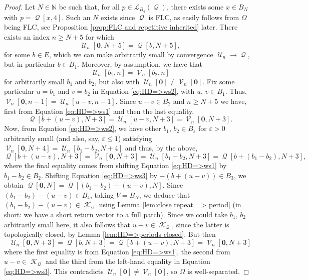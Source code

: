 \documentclass[11pt]{amsart}
\numberwithin{equation}{section}
\theoremstyle{plain}
\theoremstyle{definition}
\newcommand{\N}{\mathbb N}
\renewcommand{\epsilon}{\varepsilon}
\DeclareMathOperator{\cQ}{\mathcal{Q}}
\DeclareMathOperator{\cU}{\mathcal{U}}
\DeclareMathOperator{\cV}{\mathcal{V}}
\DeclareMathOperator{\cK}{\mathcal{K}}
\newcommand{\lang}{\mathscr{L}}
\begin{document}
\begin{proof}
Let \(N \in \N\) be such that, for all \(p \in \lang_{B_4}(\cQ)\), there exists some \(x \in B_N\) with \(p = \cQ[x,4]\). Such an \(N\) exists since \(\cQ\) is FLC, as easily follows from \(\Omega\) being FLC, see Proposition \ref{prop:FLC and repetitive inherited} later. There exists an index \(n \geq N+5\) for which
\begin{equation}\label{eq:HD=>ws1}
\cU_n[\mathbf{0},N+5] = \cQ[b,N+5] ,
\end{equation}
for some \(b \in E\), which we can make arbitrarily small by convergence \(\cU_n \to \cQ\), but in particular \(b \in B_1\). Moreover, by assumption, we have that
\begin{equation} \label{eq:HD=>ws2}
\cU_n[b_1,n] = \cV_n[b_2,n]
\end{equation}
for arbitrarily small \(b_1\) and \(b_2\), but also with \(\cU_n[\mathbf{0}] \neq \cV_n[\mathbf{0}]\). Fix some particular \(u = b_1\) and \(v = b_2\) in Equation \ref{eq:HD=>ws2}, with \(u\), \(v \in B_1\). Thus, \(\cV_n[\mathbf{0},n-1] = \cU_n[u-v,n-1]\). Since \(u-v \in B_2\) and \(n \geq N+5\) we have, first from Equation \ref{eq:HD=>ws1} and then the last equality,
\[
\cQ[b + (u-v),N+3] = \cU_n[u-v,N+3] = \cV_n[\mathbf{0},N+3] .
\]
Now, from Equation \ref{eq:HD=>ws2}, we have other \(b_1\), \(b_2 \in B_\epsilon\) for \(\epsilon > 0\) arbitrarily small (and also, say, \(\epsilon \leq 1\)) satisfying \(\cV_n[\mathbf{0},N+4] = \cU_n[b_1 - b_2,N+4]\) and thus, by the above,
\begin{equation}\label{eq:HD=>ws3}
\cQ[b + (u-v),N+3] = \cV_n[\mathbf{0},N+3] = \cU_n[b_1-b_2,N+3] = \cQ[b + (b_1-b_2),N+3] ,
\end{equation}
where the final equality comes from shifting Equation \ref{eq:HD=>ws1} by \(b_1-b_2 \in B_2\). Shifting Equation \ref{eq:HD=>ws3} by \(-(b+(u-v)) \in B_3\), we obtain \(\cQ[\mathbf{0},N] = \cQ[(b_1-b_2)-(u-v),N]\). Since \((b_1-b_2)-(u-v) \in B_4\), taking \(V = B_N\), we deduce that \((b_1-b_2)-(u-v) \in \cK_{\cQ}\) using Lemma \ref{lem:close repeat => period} (in short: we have a short return vector to a full patch). Since we could take \(b_1\), \(b_2\) arbitrarily small here, it also follows that \(u-v \in \cK_{\cQ}\), since the latter is topologically closed, by Lemma \ref{lem:HD=>periods closed}. But then
\[
\cU_n[\mathbf{0},N+3] = \cQ[b,N+3] = \cQ[b+(u-v),N+3] = \cV_n[\mathbf{0},N+3]
\]
where the first equality is from Equation \ref{eq:HD=>ws1}, the second from \(u-v \in \cK_{\cQ}\) and the third from the left-hand equality in Equation \ref{eq:HD=>ws3}. This contradicts \(\cU_n[\mathbf{0}] \neq \cV_n[\mathbf{0}]\), so \(\Omega\) is well-separated.
\end{proof}
\end{document}
